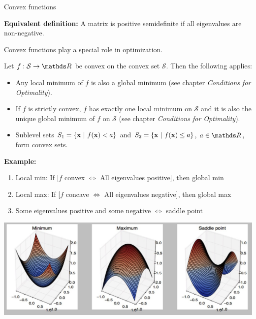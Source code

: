 \begin{vbframe}{Convex functions}
\lz

\textbf{Equivalent definition:} A matrix is positive semidefinite if all eigenvalues are non-negative.

\framebreak

Convex functions play a special role in optimization.

\lz

Let $f:\mathcal{S} \to \R$ be convex on the convex set $\mathcal{S}$. Then the following applies:

\begin{itemize}
\item Any local minimum of $f$ is also a global minimum (see chapter \emph{Conditions for Optimality}).
\item If $f$ is strictly convex, $f$ has exactly one local minimum on $\mathcal{S}$ and it is also the unique global minimum of $f$ on $\mathcal{S}$ (see chapter \emph{Conditions for Optimality}). 
\item Sublevel sets $S_1 = \{\mathbf{x}~|~f(\mathbf{x}) < a\}$ and $S_2 = \{\mathbf{x}~|~f(\mathbf{x}) \leq a \}$, $a\in \R$, form convex sets.
\end{itemize}

\framebreak


\textbf{Example:}
\footnotesize
\begin{enumerate}
\item Local min: If [$f$ convex $\Leftrightarrow$ All eigenvalues positive], then global min\\
\item Local max: If [$f$ concave $\Leftrightarrow$ All eigenvalues negative], then global max\\
\item Some eigenvalues positive and some negative $\Leftrightarrow$ saddle point
\end{enumerate}

\vspace{0.5cm}

\begin{center}
\includegraphics[scale= 0.5]{figure_man/convex.jpg}
\end{center}



\end{vbframe}
